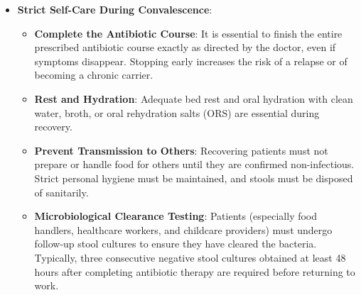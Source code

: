 \begin{itemize}
\begin{itemize}
    \item \textbf{Vi Capsular Polysaccharide Vaccine}: An intramuscular injection of purified Vi antigen. It is approved for individuals aged 2 years and older. It offers protection for 2 to 3 years, after which a booster dose is required.
    \item \textbf{Ty21a Oral Vaccine}: A live-attenuated vaccine administered as a series of 3 or 4 enteric-coated capsules taken on alternate days. It is approved for individuals aged 5 to 6 years and older. It requires a booster dose every 5 years.
  \end{itemize}
  \item \textbf{Strict Self-Care During Convalescence}:
  \begin{itemize}
    \item \textbf{Complete the Antibiotic Course}: It is essential to finish the entire prescribed antibiotic course exactly as directed by the doctor, even if symptoms disappear. Stopping early increases the risk of a relapse or of becoming a chronic carrier.
    \item \textbf{Rest and Hydration}: Adequate bed rest and oral hydration with clean water, broth, or oral rehydration salts (ORS) are essential during recovery.
    \item \textbf{Prevent Transmission to Others}: Recovering patients must not prepare or handle food for others until they are confirmed non-infectious. Strict personal hygiene must be maintained, and stools must be disposed of sanitarily.
    \item \textbf{Microbiological Clearance Testing}: Patients (especially food handlers, healthcare workers, and childcare providers) must undergo follow-up stool cultures to ensure they have cleared the bacteria. Typically, three consecutive negative stool cultures obtained at least 48 hours after completing antibiotic therapy are required before returning to work.
  \end{itemize}
\end{itemize}

